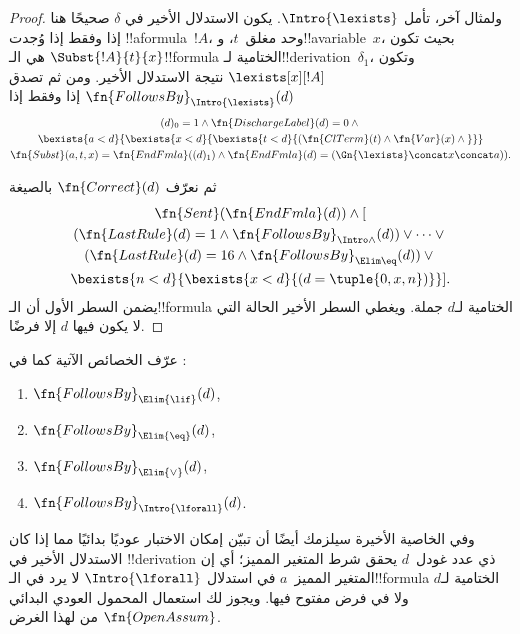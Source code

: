 \documentclass[../../../include/open-logic-section]{subfiles}
\begin{document}
\begin{proof}
  ولمثال آخر، تأمل $\Intro{\lexists}$. يكون الاستدلال الأخير في
  $\delta$ صحيحًا هنا إذا وفقط إذا وُجدت !!a{formula}~$!A$، وحد
  مغلق~$t$، و!!a{variable}~$x$، بحيث تكون $\Subst{!A}{t}{x}$ هي
  الـ!!{formula} الختامية لـ!!{derivation}~$\delta_1$، وتكون
  $\lexists[x][!A]$ نتيجة الاستدلال الأخير. ومن ثم تصدق
  $\fn{FollowsBy}_{\Intro{\lexists}}(d)$ إذا وفقط إذا
  \begin{multline*}
    (d)_0 = 1 \land \fn{DischargeLabel}(d) = 0 \land {} \\
    \bexists{a < d}{\bexists{x<d}{\bexists{t<d}{
          (\fn{ClTerm}(t) \land \fn{Var}(x)  \land {}}}}\\
    \fn{Subst}(a,t,x) = \fn{EndFmla}((d)_1) \land
    \fn{EndFmla}(d) = (\Gn{\lexists} \concat x \concat a)).
  \end{multline*}

  ثم نعرّف $\fn{Correct}(d)$ بالصيغة
  \begin{multline*}
    \fn{Sent}(\fn{EndFmla}(d)) \land [ {}\\
    (\fn{LastRule}(d) = 1 \land
    \fn{FollowsBy}_{\Intro\land}(d)) \lor \dots \lor {}\\
    (\fn{LastRule}(d) = 16 \land \fn{FollowsBy}_{\Elim\eq}(d)) \lor {}\\
    \bexists{n<d}{\bexists{x<d}{(d = \tuple{0, x, n})}}].
  \end{multline*}
  يضمن السطر الأول أن الـ!!{formula} الختامية لـ$d$ جملة. ويغطي السطر
  الأخير الحالة التي لا يكون فيها $d$ إلا فرضًا.
\end{proof}

\begin{prob}
  عرّف الخصائص الآتية كما في
  :
  \begin{enumerate}
  \item $\fn{FollowsBy}_{\Elim{\lif}}(d)$,
  \item $\fn{FollowsBy}_{\Elim{\eq}}(d)$,
  \item $\fn{FollowsBy}_{\Elim{\lor}}(d)$,
  \item $\fn{FollowsBy}_{\Intro{\lforall}}(d)$.
  \end{enumerate}
  وفي الخاصية الأخيرة سيلزمك أيضًا أن تبيّن إمكان الاختبار عوديًا
  بدائيًا مما إذا كان الاستدلال الأخير في !!{derivation} ذي عدد
  غودل~$d$ يحقق شرط المتغير المميز؛ أي إن المتغير المميز~$a$ في
  استدلال $\Intro{\lforall}$ لا يرد في الـ!!{formula} الختامية لـ$d$ ولا
  في فرض مفتوح فيها. ويجوز لك استعمال المحمول العودي البدائي
  $\fn{OpenAssum}$ من  لهذا الغرض.
\end{prob}
\end{document}
